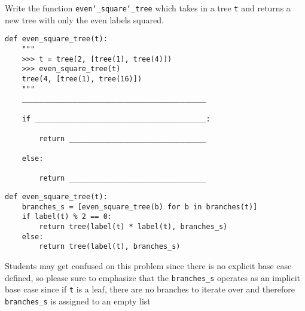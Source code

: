 \begin{blocksection}
\question Write the function \texttt{even\char`_square\char`_tree} which takes in a
tree \texttt{t} and returns a new tree with only the even labels squared.
\end{blocksection}

\begin{lstlisting}
def even_square_tree(t):
    """
    >>> t = tree(2, [tree(1), tree(4)])
    >>> even_square_tree(t)
    tree(4, [tree(1), tree(16)])
    """
    ___________________________________________

    if ________________________________________:

        return ________________________________

    else:

        return ________________________________

\end{lstlisting}

\begin{solution}
\begin{lstlisting}
def even_square_tree(t):
    branches_s = [even_square_tree(b) for b in branches(t)]
    if label(t) % 2 == 0:
        return tree(label(t) * label(t), branches_s)
    else:
        return tree(label(t), branches_s)
\end{lstlisting}
\end{solution}

\begin{meta}
    Students may get confused on this problem since there is no explicit base case defined,
    so please sure to emphasize that the \lstinline{branches_s} operates as an implicit base case
    since if \lstinline{t} is a leaf, there are no branches to iterate over and therefore \lstinline{branches_s}
    is assigned to an empty list
\end{meta}
